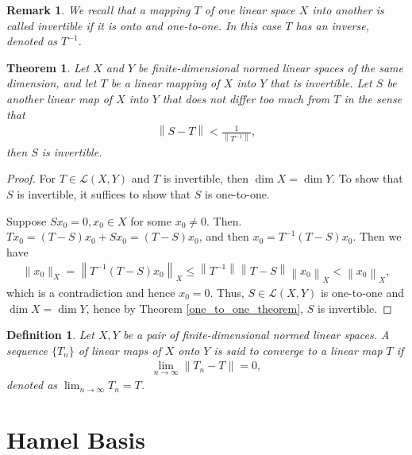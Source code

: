 \documentclass[10pt]{book}
\newtheorem{definition}{Definition}[chapter]
\newtheorem{theorem}{Theorem}[chapter]
\newtheorem{remark}{Remark}[chapter]
\theoremstyle{definition}
\numberwithin{equation}{chapter}
\begin{document}
\begin{remark}
We recall that a mapping $T$ of one linear space $X$ into another is called invertible if it is onto and one-to-one. In this case $T$ has an inverse, denoted as $T^{-1}$.
\end{remark}

\medskip

\begin{theorem}
Let $X$ and $Y$ be finite-dimensional normed linear spaces of the same dimension, and let $T$ be a linear mapping of $X$ into $Y$ that is invertible. Let $S$ be another linear map of $X$ into $Y$ that does not differ too much from $T$ in the sense that
\begin{align*}
    \left\|S - T\right\| < \frac{1}{\left\|T^{-1}\right\|},
\end{align*}
then $S$ is invertible.
\end{theorem}
\begin{proof}
For $T \in \mathscr{L}(X, Y)$ and $T$ is invertible, then $\dim X = \dim Y$. To show that $S$ is invertible, it suffices to show that $S$ is one-to-one.

Suppose $Sx_0 = 0, x_0 \in X$ for some $x_0 \neq 0$. Then. $Tx_0 = (T - S)x_0 + Sx_0 = (T - S)x_0$, and then $x_0 = T^{-1} (T - S)x_0$. Then we have
\begin{align*}
    \|x_0\|_X = \left\|T^{-1}(T - S)x_0\right\|_X \leq \left\|T^{-1}\right\| \left\|T - S\right\| \left\| x_0\right\|_X < \left\| x_0\right\|_X,
\end{align*}
which is a contradiction and hence $x_0 = 0$. Thus, $S \in \mathscr{L}(X,Y)$ is one-to-one and $\dim X = \dim Y$, hence by Theorem \ref{one_to_one_theorem}, $S$ is invertible.
\end{proof}

\medskip

\begin{definition}
Let $X, Y$ be a pair of finite-dimensional normed linear spaces. A sequence $\{T_n\}$ of linear maps of $X$ onto $Y$ is said to converge to a linear map $T$ if 
\begin{align*}
    \lim_{n \to \infty} \left\|T_n - T\right\| = 0,
\end{align*}
denoted as $\lim_{n \to \infty} T_n = T$.
\end{definition}

\medskip

\section{Hamel Basis}
\end{document}
